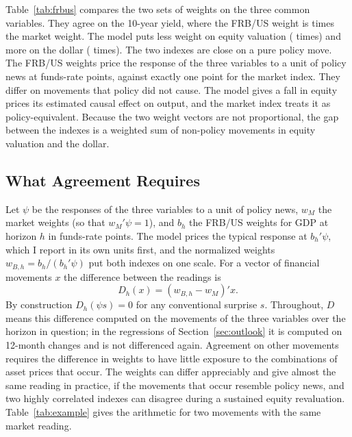 \documentclass[11pt]{article}
\begin{document}
Table~\ref{tab:frbus} compares the two sets of weights on the three common variables. They agree on the 10-year yield, where the FRB/US weight is  times the market weight. The model puts less weight on equity valuation ( times) and more on the dollar ( times). The two indexes are close on a pure policy move. The FRB/US weights price the response of the three variables to a unit of policy news at  funds-rate points, against exactly one point for the market index. They differ on movements that policy did not cause. The model gives a fall in equity prices its estimated causal effect on output, and the market index treats it as policy-equivalent. Because the two weight vectors are not proportional, the gap between the indexes is a weighted sum of non-policy movements in equity valuation and the dollar.


\FloatBarrier



\subsection{What Agreement Requires}\label{sec:requires}
Let $\psi$ be the responses of the three variables to a unit of policy news, $w_M$ the market weights (so that $w_M'\psi=1$), and $b_h$ the FRB/US weights for GDP at horizon $h$ in funds-rate points. The model prices the typical response at $b_h'\psi$, which I report in its own units first, and the normalized weights $w_{B,h}=b_h/(b_h'\psi)$ put both indexes on one scale. For a vector of financial movements $x$ the difference between the readings is
\[
D_h(x)=(w_{B,h}-w_M)'x.
\]
By construction $D_h(\psi s)=0$ for any conventional surprise $s$. Throughout, $D$ means this difference computed on the movements of the three variables over the horizon in question; in the regressions of Section~\ref{sec:outlook} it is computed on 12-month changes and is not differenced again. Agreement on other movements requires the difference in weights to have little exposure to the combinations of asset prices that occur. The weights can differ appreciably and give almost the same reading in practice, if the movements that occur resemble policy news, and two highly correlated indexes can disagree during a sustained equity revaluation. Table~\ref{tab:example} gives the arithmetic for two movements with the same market reading.
\end{document}
